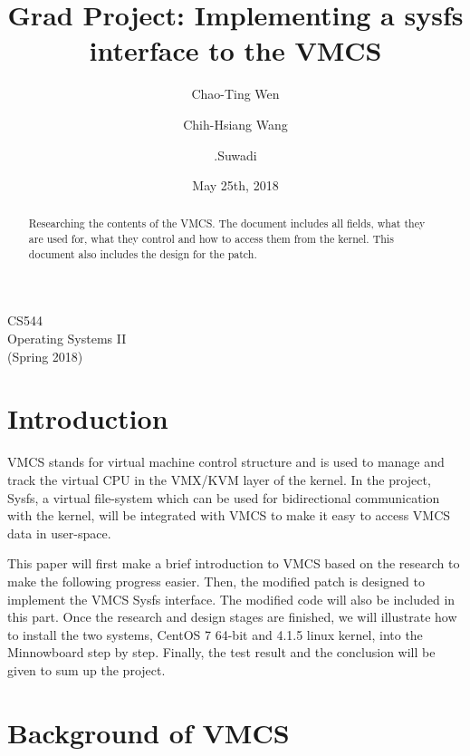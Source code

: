 \documentclass[10pt,draftclsnofoot,journal,compsoc,onecolumn]{IEEEtran}
\title{Grad Project: Implementing a sysfs interface to the VMCS}
\author{
  Chao-Ting Wen \hspace{.5cm}
  \and
  Chih-Hsiang Wang \hspace{.5cm}
  \and
  .Suwadi
}
\date{May 25th, 2018}
\begin{document}
\begin{titlepage} 
\maketitle
\begin{center}
CS544\\
Operating Systems II\\
(Spring 2018)
\vspace{50 mm}
\end{center}

\begin{abstract}
	Researching the contents of the VMCS. The document includes all fields, what they are used for, what they control and how to access them from the kernel. This document also includes the design for the patch.
\end{abstract}
\end{titlepage}

\tableofcontents

\clearpage
\section{Introduction}
	\par VMCS stands for virtual machine control structure and is used to manage and track the virtual CPU in the VMX/KVM layer of the kernel. In the project, Sysfs, a virtual file-system which can be used for bidirectional communication with the kernel, will be integrated with VMCS to make it easy to access VMCS data in user-space. 
    \par This paper will first make a brief introduction to VMCS based on the research to make the following progress easier. Then, the modified patch is designed to implement the VMCS Sysfs interface. The modified code will also be included in this part. Once the research and design stages are finished, we will illustrate how to install the two systems, CentOS 7 64-bit and 4.1.5 linux kernel, into the Minnowboard step by step. Finally, the test result and the conclusion will be given to sum up the project. 
	
\section{Background of VMCS}
\end{document}
